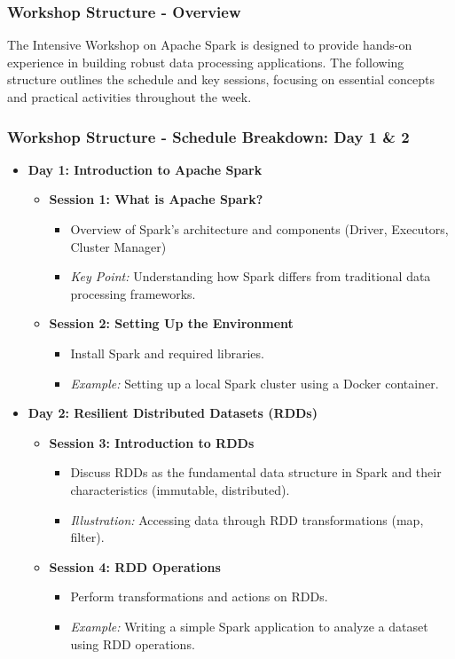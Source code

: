 \documentclass[aspectratio=169]{beamer}
\begin{document}
\begin{frame}[fragile]
    \frametitle{Workshop Structure - Overview}
    The Intensive Workshop on Apache Spark is designed to provide hands-on experience in building robust data processing applications. The following structure outlines the schedule and key sessions, focusing on essential concepts and practical activities throughout the week.
\end{frame}

\begin{frame}[fragile]
    \frametitle{Workshop Structure - Schedule Breakdown: Day 1 & 2}
    \begin{itemize}
        \item \textbf{Day 1: Introduction to Apache Spark}
        \begin{itemize}
            \item \textbf{Session 1: What is Apache Spark?}
            \begin{itemize}
                \item Overview of Spark's architecture and components (Driver, Executors, Cluster Manager)
                \item \textit{Key Point:} Understanding how Spark differs from traditional data processing frameworks.
            \end{itemize}
            \item \textbf{Session 2: Setting Up the Environment}
            \begin{itemize}
                \item Install Spark and required libraries.
                \item \textit{Example:} Setting up a local Spark cluster using a Docker container.
            \end{itemize}
        \end{itemize}

        \item \textbf{Day 2: Resilient Distributed Datasets (RDDs)}
        \begin{itemize}
            \item \textbf{Session 3: Introduction to RDDs}
            \begin{itemize}
                \item Discuss RDDs as the fundamental data structure in Spark and their characteristics (immutable, distributed).
                \item \textit{Illustration:} Accessing data through RDD transformations (map, filter).
            \end{itemize}
            \item \textbf{Session 4: RDD Operations}
            \begin{itemize}
                \item Perform transformations and actions on RDDs.
                \item \textit{Example:} Writing a simple Spark application to analyze a dataset using RDD operations.
            \end{itemize}
        \end{itemize}
    \end{itemize}
\end{frame}
\end{document}
